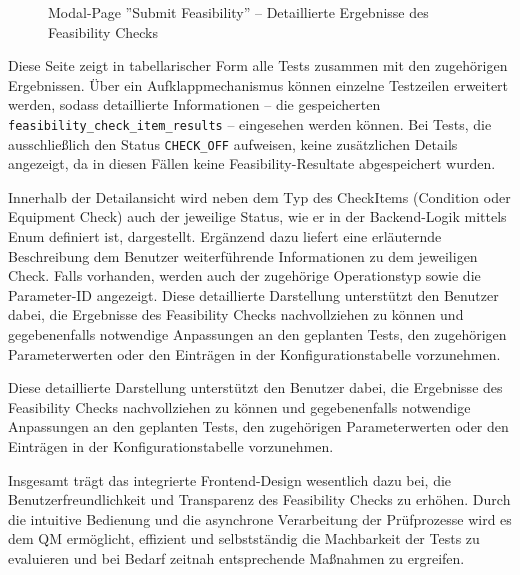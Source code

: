 \begin{figure}[!htbp] 
    \centering 
    \caption{Modal-Page ''Submit Feasibility'' – Detaillierte Ergebnisse des Feasibility Checks} 
    \label{fig:result-details} 
\end{figure}

Diese Seite zeigt in tabellarischer Form alle Tests zusammen mit den zugehörigen Ergebnissen. Über ein Aufklappmechanismus können einzelne Testzeilen erweitert werden, sodass detaillierte Informationen – die gespeicherten \texttt{feasibility\_check\_item\_results} – eingesehen werden können. Bei Tests, die ausschließlich den Status \texttt{CHECK\_OFF} aufweisen, keine zusätzlichen Details angezeigt, da in diesen Fällen keine Feasibility-Resultate abgespeichert wurden.

Innerhalb der Detailansicht wird neben dem Typ des CheckItems (Condition oder Equipment Check) auch der jeweilige Status, wie er in der Backend-Logik mittels Enum definiert ist, dargestellt. Ergänzend dazu liefert eine erläuternde Beschreibung dem Benutzer weiterführende Informationen zu dem jeweiligen Check. Falls vorhanden, werden auch der zugehörige Operationstyp sowie die Parameter-ID angezeigt. Diese detaillierte Darstellung unterstützt den Benutzer dabei, die Ergebnisse des Feasibility Checks nachvollziehen zu können und gegebenenfalls notwendige Anpassungen an den geplanten Tests, den zugehörigen Parameterwerten oder den Einträgen in der Konfigurationstabelle vorzunehmen.

Diese detaillierte Darstellung unterstützt den Benutzer dabei, die Ergebnisse des Feasibility Checks nachvollziehen zu können und gegebenenfalls notwendige Anpassungen an den geplanten Tests, den zugehörigen Parameterwerten oder den Einträgen in der Konfigurationstabelle vorzunehmen.

Insgesamt trägt das integrierte Frontend-Design wesentlich dazu bei, die Benutzerfreundlichkeit und Transparenz des Feasibility Checks zu erhöhen. Durch die intuitive Bedienung und die asynchrone Verarbeitung der Prüfprozesse wird es dem \gls{QM} ermöglicht, effizient und selbstständig die Machbarkeit der Tests zu evaluieren und bei Bedarf zeitnah entsprechende Maßnahmen zu ergreifen.


